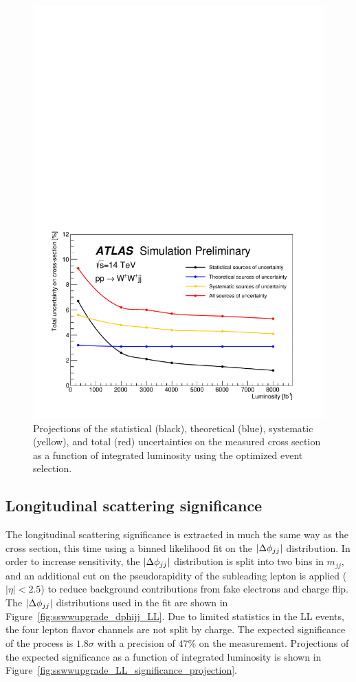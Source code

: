 \begin{figure}[htbp]
  \centering
  \includegraphics[width=.8\textwidth]{figs/ssww_upgrade/results/uncertainty_projection}
  \caption{Projections of the statistical (black), theoretical (blue), systematic (yellow), and total (red) uncertainties on the measured cross section as a function of integrated luminosity using the optimized event selection.}
  \label{fig:sswwupgrade_uncertainty_projection}
\end{figure}

\subsection{Longitudinal scattering significance}\label{sswwupgrade:results_longitudinal_sig}
The longitudinal scattering significance is extracted in much the same way as the cross section, this time using a binned likelihood fit on the $|\Delta\phi_{jj}|$ distribution.
In order to increase sensitivity, the $|\Delta\phi_{jj}|$ distribution is split into two bins in $m_{jj}$, and an additional cut on the pseudorapidity of the subleading lepton is applied ($|\eta| < 2.5$) to reduce background contributions from fake electrons and charge flip.
The $|\Delta\phi_{jj}|$ distributions used in the fit are shown in Figure~\ref{fig:sswwupgrade_dphijj_LL}.
Due to limited statistics in the LL events, the four lepton flavor channels are not split by charge.
The expected significance of the \sswwll process is $1.8\sigma$ with a precision of $47\%$ on the measurement.
Projections of the expected significance as a function of integrated luminosity is shown in Figure~\ref{fig:sswwupgrade_LL_significance_projection}.

